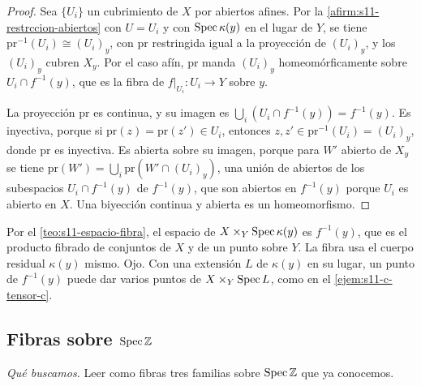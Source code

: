 \begin{proof}
Sea \(\{U_i\}\) un cubrimiento de \(X\) por abiertos afines. Por la \cref{afirm:s11-restrccion-abiertos} con \(U=U_i\) y con \(\operatorname{Spec}\kappa(y)\) en el lugar de \(Y\), se tiene \(\mathrm{pr}^{-1}(U_i)\cong(U_i)_y\), con \(\mathrm{pr}\) restringida igual a la proyección de \((U_i)_y\), y los \((U_i)_y\) cubren \(X_y\). Por el caso afín, \(\mathrm{pr}\) manda \((U_i)_y\) homeomórficamente sobre \(U_i\cap f^{-1}(y)\), que es la fibra de \(f|_{U_i}\colon U_i\to Y\) sobre \(y\).

La proyección \(\mathrm{pr}\) es continua, y su imagen es \(\bigcup_i(U_i\cap f^{-1}(y))=f^{-1}(y)\). Es inyectiva, porque si \(\mathrm{pr}(z)=\mathrm{pr}(z')\in U_i\), entonces \(z,z'\in\mathrm{pr}^{-1}(U_i)=(U_i)_y\), donde \(\mathrm{pr}\) es inyectiva. Es abierta sobre su imagen, porque para \(W'\) abierto de \(X_y\) se tiene \(\mathrm{pr}(W')=\bigcup_i\mathrm{pr}(W'\cap(U_i)_y)\), una unión de abiertos de los subespacios \(U_i\cap f^{-1}(y)\) de \(f^{-1}(y)\), que son abiertos en \(f^{-1}(y)\) porque \(U_i\) es abierto en \(X\). Una biyección continua y abierta es un homeomorfismo.
\end{proof}

\begin{obs}
\label{obs:s11-fibra-espacio-producto}
Por el \cref{teo:s11-espacio-fibra}, el espacio de \(X\times_Y\operatorname{Spec}\kappa(y)\) es \(f^{-1}(y)\), que es el producto fibrado de conjuntos de \(X\) y de un punto sobre \(Y\). La fibra usa el cuerpo residual \(\kappa(y)\) mismo. Ojo. Con una extensión \(L\) de \(\kappa(y)\) en su lugar, un punto de \(f^{-1}(y)\) puede dar varios puntos de \(X\times_Y\operatorname{Spec} L\), como en el \cref{ejem:s11-c-tensor-c}.
\end{obs}

\subsection{Fibras sobre \texorpdfstring{\(\operatorname{Spec}\mathbb Z\)}{Spec Z}}

\emph{Qué buscamos.} Leer como fibras tres familias sobre \(\operatorname{Spec}\mathbb Z\) que ya conocemos.

